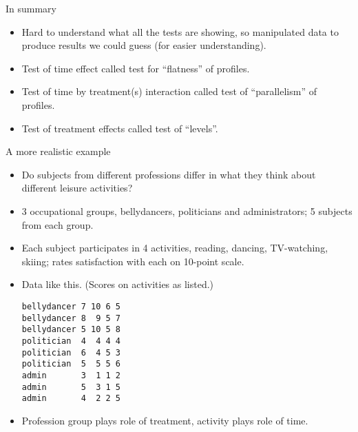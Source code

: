 \documentclass[pdf]{prosper}
\begin{document}
\begin{slide}{In summary}

  \begin{itemize}
  \item 
Hard to understand what all the tests are showing, so manipulated data
to produce results we could guess (for easier understanding).
\item Test of time effect called test for ``flatness'' of profiles.
\item Test of time by treatment(s) interaction called test of ``parallelism'' of profiles.
\item Test of treatment effects called test of ``levels''.
  \end{itemize}
    
  \end{slide}


\begin{slide}{A more realistic example}

  \begin{itemize}
  \item Do subjects from different professions differ in what they think about different leisure activities?
  \item 3 occupational groups, bellydancers, politicians and administrators; 5 subjects from each group.
  \item Each subject participates in 4 activities, reading, dancing, TV-watching, skiing; rates satisfaction with each on 10-point scale.
  \item Data like this. (Scores on activities as listed.)
{\scriptsize
\begin{verbatim}
bellydancer 7 10 6 5
bellydancer 8  9 5 7
bellydancer 5 10 5 8
politician  4  4 4 4
politician  6  4 5 3
politician  5  5 5 6
admin       3  1 1 2
admin       5  3 1 5
admin       4  2 2 5
\end{verbatim}
}
\item Profession group plays role of treatment, activity plays role of time.
  \end{itemize}
  
\end{slide}
\end{document}

